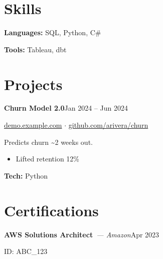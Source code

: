 \documentclass{article}
\begin{document}
\section*{Skills}
\noindent \textbf{Languages:} SQL, Python, C\#\par
\vspace{2pt}
\noindent \textbf{Tools:} Tableau, dbt\par

\section*{Projects}
\noindent\textbf{Churn Model 2.0}\hfill{\small Jan 2024 -- Jun 2024}\par
{\small \href{https://demo.example.com}{demo.example.com} $\cdot$ \href{https://github.com/arivera/churn}{github.com/arivera/churn}}\par
Predicts churn \textasciitilde{}2 weeks out.\par
\begin{itemize}[leftmargin=1.25em, itemsep=2pt, topsep=2pt, parsep=0pt]
  \item Lifted retention 12\%
\end{itemize}
{\small\textbf{Tech:} Python}\par

\section*{Certifications}
\noindent\textbf{AWS Solutions Architect}{\small\itshape\ — Amazon}\hfill{\small Apr 2023}\par
{\small ID: ABC\_123}\par
\end{document}
